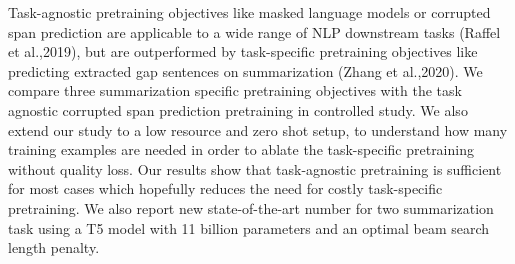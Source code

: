 Task-agnostic pretraining objectives like masked language models or corrupted span prediction are applicable to a wide range of NLP downstream tasks (Raffel et al.,2019), but are outperformed by task-specific pretraining objectives like predicting extracted gap sentences on summarization (Zhang et al.,2020). We compare three summarization specific pretraining objectives with the task agnostic corrupted span prediction pretraining in controlled study. We also extend our study to a low resource and zero shot setup, to understand how many training examples are needed in order to ablate the task-specific pretraining without quality loss. Our results show that task-agnostic pretraining is sufficient for most cases which hopefully reduces the need for costly task-specific pretraining. We also report new state-of-the-art number for two summarization task using a T5 model with 11 billion parameters and an optimal beam search length penalty.
